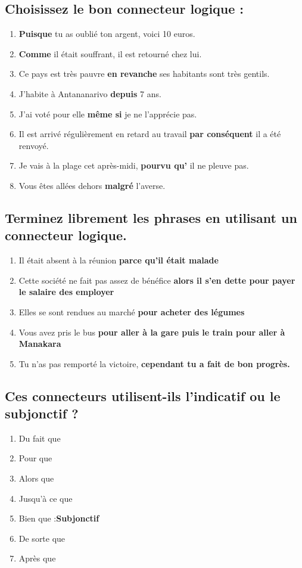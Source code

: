 \documentclass[12pt]{article}
\newcommand{\colo}[1]{{\color{blue}\textbf{#1}}}
\begin{document}
\subsection{Choisissez le bon connecteur logique : }
\begin{enumerate}
	\item \colo{Puisque} tu as oublié ton argent, voici 10 euros.
	\item \colo{Comme} il était souffrant, il est retourné chez lui.
	\item Ce pays est très pauvre \colo{en revanche} ses habitants sont très gentils.
	\item J’habite à Antananarivo \colo{depuis} 7 ans.
	\item J’ai voté pour elle \colo{même si} je ne l’apprécie pas.
	\item Il est arrivé régulièrement en retard au travail \colo{par conséquent} il a été renvoyé.
	\item Je vais à la plage cet après-midi, \colo{pourvu qu’} il ne pleuve pas. \item Vous êtes allées dehors \colo{malgré} l’averse.
\end{enumerate}

\subsection{Terminez librement les phrases en utilisant un connecteur logique.}
\begin{enumerate}
	\item Il était absent à la réunion \colo{parce qu'il était malade}
	\item Cette société ne fait pas assez de bénéfice \colo{alors il s'en dette pour payer le salaire des employer}
	\item Elles se sont rendues au marché \colo{pour acheter des légumes}
	\item Vous avez pris le bus \colo{pour aller à la gare puis le train pour aller à Manakara}
	\item Tu n’as pas remporté la victoire, \colo{cependant tu a fait de bon progrès.}
\end{enumerate}

\subsection{Ces connecteurs utilisent-ils l'indicatif ou le subjonctif ?}
\begin{enumerate}
	\item Du fait que
	\item Pour que
	\item Alors que
	\item Jusqu'à ce que
	\item Bien que :\colo{Subjonctif}
	\item De sorte que
	\item Après que
\end{enumerate}
\end{document}
